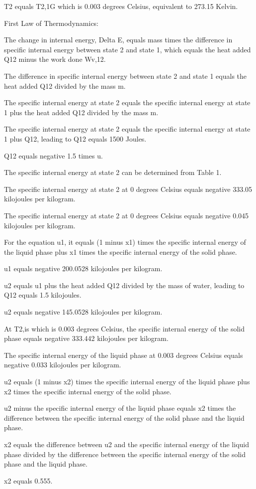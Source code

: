 T2 equals T2,1G which is 0.003 degrees Celsius, equivalent to 273.15 Kelvin.

First Law of Thermodynamics:

The change in internal energy, Delta E, equals mass times the difference in specific internal energy between state 2 and state 1, which equals the heat added Q12 minus the work done Wv,12.

The difference in specific internal energy between state 2 and state 1 equals the heat added Q12 divided by the mass m.

The specific internal energy at state 2 equals the specific internal energy at state 1 plus the heat added Q12 divided by the mass m.

The specific internal energy at state 2 equals the specific internal energy at state 1 plus Q12, leading to Q12 equals 1500 Joules.

Q12 equals negative 1.5 times u.

The specific internal energy at state 2 can be determined from Table 1.

The specific internal energy at state 2 at 0 degrees Celsius equals negative 333.05 kilojoules per kilogram.

The specific internal energy at state 2 at 0 degrees Celsius equals negative 0.045 kilojoules per kilogram.

For the equation u1, it equals (1 minus x1) times the specific internal energy of the liquid phase plus x1 times the specific internal energy of the solid phase.

u1 equals negative 200.0528 kilojoules per kilogram.

u2 equals u1 plus the heat added Q12 divided by the mass of water, leading to Q12 equals 1.5 kilojoules.

u2 equals negative 145.0528 kilojoules per kilogram.

At T2,is which is 0.003 degrees Celsius, the specific internal energy of the solid phase equals negative 333.442 kilojoules per kilogram.

The specific internal energy of the liquid phase at 0.003 degrees Celsius equals negative 0.033 kilojoules per kilogram.

u2 equals (1 minus x2) times the specific internal energy of the liquid phase plus x2 times the specific internal energy of the solid phase.

u2 minus the specific internal energy of the liquid phase equals x2 times the difference between the specific internal energy of the solid phase and the liquid phase.

x2 equals the difference between u2 and the specific internal energy of the liquid phase divided by the difference between the specific internal energy of the solid phase and the liquid phase.

x2 equals 0.555.